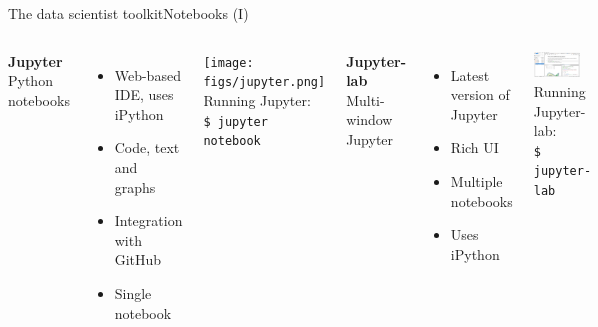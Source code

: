 \documentclass[10pt,compress]{beamer} %
\begin{document}
\begin{frame}{The data scientist toolkit}{Notebooks (I)}
    \begin{columns}[t]
	   \centering \textbf{Jupyter}\\
		\flushleft Python notebooks\\
	\begin{itemize}
		\item Web-based IDE, uses iPython
		\item Code, text and graphs
		\item Integration with GitHub
		\item Single notebook
	\end{itemize}

		\texttt{[image: figs/jupyter.png]}	\\

		Running Jupyter:\\
		\texttt{\$ jupyter notebook}

	   \centering \textbf{Jupyter-lab}\\
		\flushleft Multi-window Jupyter\\
		\begin{itemize}
			\item Latest version of Jupyter
			\item Rich UI
			\item Multiple notebooks
			\item Uses iPython
		\end{itemize}

		\includegraphics[width=0.8\textwidth]{figs/jupyterlab.png}\\
	Running Jupyter-lab:\\
	\texttt{\$ jupyter-lab}

	\end{columns}
\end{frame}
\end{document}
